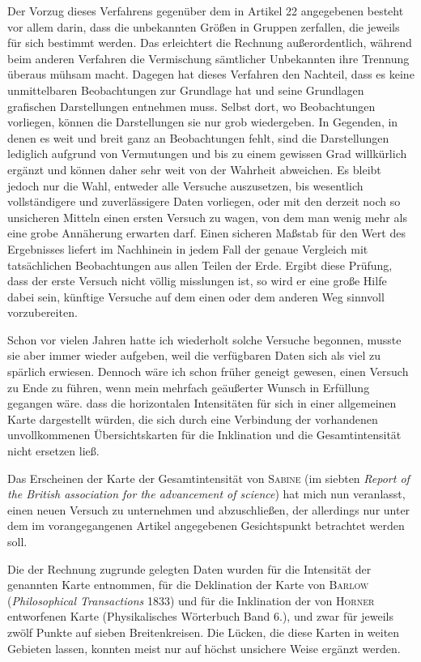 Der Vorzug dieses Verfahrens gegenüber dem in Artikel 22 angegebenen besteht vor allem darin, dass die unbekannten Größen in Gruppen zerfallen, die jeweils für sich bestimmt werden. Das erleichtert die Rechnung außerordentlich, während beim anderen Verfahren die Vermischung sämtlicher Unbekannten ihre Trennung überaus mühsam macht. Dagegen hat dieses Verfahren den Nachteil, dass es keine unmittelbaren Beobachtungen zur Grundlage hat und seine Grundlagen grafischen Darstellungen entnehmen muss. Selbst dort, wo Beobachtungen vorliegen, können die Darstellungen sie nur grob wiedergeben. In Gegenden, in denen es weit und breit ganz an Beobachtungen fehlt, sind die Darstellungen lediglich aufgrund von Vermutungen und bis zu einem gewissen Grad willkürlich ergänzt und können daher sehr weit von der Wahrheit abweichen. Es bleibt jedoch nur die Wahl, entweder alle Versuche auszusetzen, bis wesentlich vollständigere und zuverlässigere Daten vorliegen, oder mit den derzeit noch so unsicheren Mitteln einen ersten Versuch zu wagen, von dem man wenig mehr als eine grobe Annäherung erwarten darf. Einen sicheren Maßstab für den Wert des Ergebnisses liefert im Nachhinein in jedem Fall der genaue Vergleich mit tatsächlichen Beobachtungen aus allen Teilen der Erde. Ergibt diese Prüfung, dass der erste Versuch nicht völlig misslungen ist, so wird er eine große Hilfe dabei sein, künftige Versuche auf dem einen oder dem anderen Weg sinnvoll vorzubereiten.

Schon vor vielen Jahren hatte ich wiederholt solche Versuche begonnen, musste sie aber immer wieder aufgeben, weil die verfügbaren Daten sich als viel zu spärlich erwiesen. Dennoch wäre ich schon früher geneigt gewesen, einen Versuch zu Ende zu führen, wenn mein mehrfach geäußerter Wunsch in Erfüllung gegangen wäre. dass die horizontalen Intensitäten für sich in einer allgemeinen Karte dargestellt würden, die sich durch eine Verbindung der vorhandenen unvollkommenen Übersichtskarten für die Inklination und die Gesamtintensität nicht ersetzen ließ.

Das Erscheinen der Karte der Gesamtintensität von \textsc{Sabine} (im siebten \textit{Report of the British association for the advancement of science}) hat mich nun veranlasst, einen neuen Versuch zu unternehmen und abzuschließen, der allerdings nur unter dem im vorangegangenen Artikel angegebenen Gesichtspunkt betrachtet werden soll.

Die der Rechnung zugrunde gelegten Daten wurden für die Intensität der genannten Karte entnommen, für die Deklination der Karte von \textsc{Barlow} (\textit{Philosophical Transactions} 1833) und für die Inklination der von \textsc{Horner} entworfenen Karte (Physikalisches Wörterbuch Band 6.), und zwar für jeweils zwölf Punkte auf sieben Breitenkreisen. Die Lücken, die diese Karten in weiten Gebieten lassen, konnten meist nur auf höchst unsichere Weise ergänzt werden.

